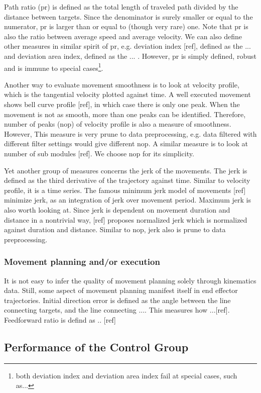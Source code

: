 Path ratio (pr) is defined as the total length of traveled path divided by the distance between targets. 
Since the denominator is surely smaller or equal to the numerator, pr is larger than or equal to (though very rare) one. 
Note that pr is also the ratio between average speed and average velocity. 
We can also define other measures in similar spirit of pr, e.g. deviation index [ref], defined as the ... and deviation area index, defined as the ... . However, pr is simply defined, robust and is immune to special cases\footnote{both deviation index and deviation area index fail at special cases, such as...}. 

Another way to evaluate movement smoothness is to look at velocity profile, which is the tangential velocity plotted against time. 
A well executed movement shows bell curve profile [ref], in which case there is only one peak. 
When the movement is not as smooth, more than one peaks can be identified. 
Therefore, number of peaks (nop) of velocity profile is also a measure of smoothness. 
However, This measure is very prune to data preprocessing, e.g. data filtered with different filter settings would give different nop. 
A similar measure is to look at number of sub modules [ref]. We choose nop for its simplicity.

Yet another group of measures concerns the jerk of the movements. 
The jerk is defined as the third derivative of the trajectory against time. 
Similar to velocity profile, it is a time series. 
The famous minimum jerk model of movements [ref] minimize jerk, as an integration of jerk over movement period. 
Maximum jerk is also worth looking at. 
Since jerk is dependent on movement duration and distance in a nontrivial way, [ref] proposes normalized jerk which is normalized against duration and distance. 
Similar to nop, jerk also is prune to data preprocessing.

\subsubsection{Movement planning and/or execution}
It is not easy to infer the quality of movement planning solely through kinematics data.
Still, some aspect of movement planning manifest itself in end effector trajectories.
Initial direction error is defined as the angle between the line connecting targets, and the line connecting .... This measures how ...[ref]. 
Feedforward ratio is defind as .. [ref]




\subsection{Performance of the Control Group}

